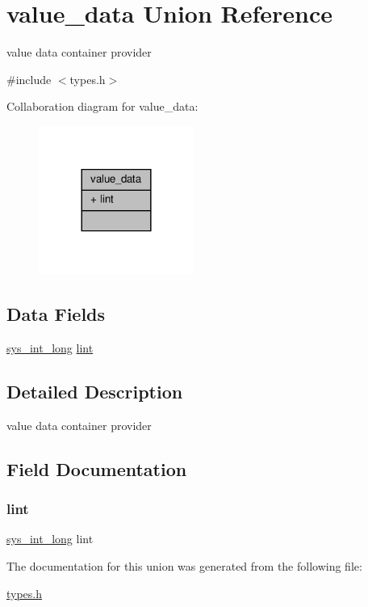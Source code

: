 \hypertarget{unionvalue__data}{}\section{value\+\_\+data Union Reference}
\label{unionvalue__data}


value data container provider  




{\ttfamily \#include $<$types.\+h$>$}



Collaboration diagram for value\+\_\+data\+:
\nopagebreak
\begin{figure}[H]
\begin{center}
\leavevmode
\includegraphics[width=144pt]{unionvalue__data__coll__graph}
\end{center}
\end{figure}
\subsection*{Data Fields}
\begin{DoxyCompactItemize}
\item 
\hyperlink{types_8h_a5b2030ae244cd6621f11f4bf6d181dbf}{sys\+\_\+int\+\_\+long} \hyperlink{unionvalue__data_a16d792f39cc926e4b92c279ab3aa68eb}{lint}
\end{DoxyCompactItemize}


\subsection{Detailed Description}
value data container provider 

\subsection{Field Documentation}
\mbox{\label{unionvalue__data_a16d792f39cc926e4b92c279ab3aa68eb}} 
\subsubsection{\texorpdfstring{lint}{lint}}
{\footnotesize\ttfamily \hyperlink{types_8h_a5b2030ae244cd6621f11f4bf6d181dbf}{sys\+\_\+int\+\_\+long} lint}



The documentation for this union was generated from the following file\+:\begin{DoxyCompactItemize}
\item 
\hyperlink{types_8h}{types.\+h}\end{DoxyCompactItemize}
